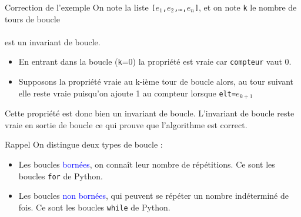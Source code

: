 \documentclass[10pt]{beamer}
\begin{document}
\begin{frame}
\mframe{\Specification}
\begin{exampleblock}{Correction de l'exemple}
\textcolor{OliveGreen}{On note la liste \texttt{[$e_1$,$e_2$,\dots,$e_n$]}, et on note \texttt{k} le nombre de tours de boucle\\}
 \\
\textcolor{OliveGreen}{ est un invariant de boucle.}
\begin{itemize}
\item<4-> \textcolor{OliveGreen}{En entrant dans la boucle (\texttt{k}=0) la propriété est vraie car \texttt{compteur} vaut 0.}
\item<5-> \textcolor{OliveGreen}{Supposons la propriété vraie au k-ième tour de boucle alors, au tour suivant elle reste vraie puisqu'on ajoute 1 au compteur lorsque \texttt{elt=$e_{k+1}$}}
\end{itemize}
\textcolor{OliveGreen}{Cette propriété est donc bien un invariant de boucle.}
\textcolor{OliveGreen}{L'invariant de boucle reste vraie en sortie de boucle ce qui prouve que l'algorithme est correct.}
\end{exampleblock}
\end{frame}

\begin{frame}
\mframe{\Specification}
\begin{block}{\textcolor{yellow}{\rappel\;} Rappel}
On distingue deux types de boucle :
\begin{itemize}
\item<2-> Les boucles \textcolor{blue}{bornées}, on connaît leur nombre de répétitions. Ce sont les boucles \texttt{for} de Python.
\item<3-> Les boucles \textcolor{blue}{non bornées}, qui peuvent se répéter un nombre indéterminé de fois. Ce sont les boucles \texttt{while} de Python.
\end{itemize}
\end{block}
\end{frame}
\end{document}
